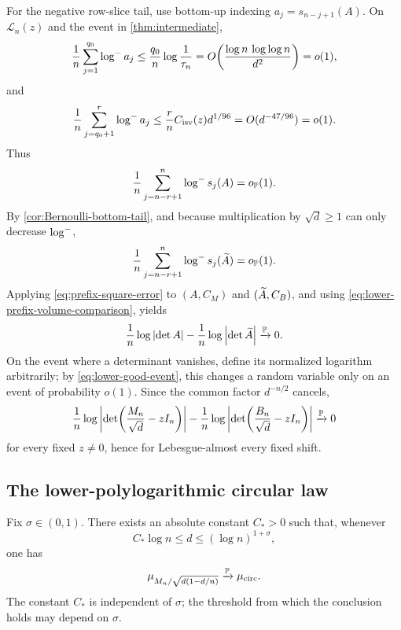 For the negative row-slice tail, use bottom-up indexing
$a_j=s_{n-j+1}(A)$. On $\mathcal L_n(z)$ and the event in \cref{thm:intermediate},
\begin{equation}\label{eq:lower-bottom-q0}
  \frac1n\sum_{j=1}^{q_0}\log^{-} a_j
  \le\frac{q_0}{n}\log\frac1{\tau_n}
  =O\!\left(\frac{\log n\,\log\log n}{d^2}\right)=o(1),
\end{equation}
and
\begin{equation}\label{eq:lower-bottom-intermediate}
  \frac1n\sum_{j=q_0+1}^{r}\log^{-} a_j
  \le\frac rn C_{\mathrm{isv}}(z)d^{1/96}
  =O(d^{-47/96})=o(1).
\end{equation}
Thus
\begin{equation}\label{eq:lower-row-bottom-tail}
  \frac1n\sum_{j=n-r+1}^n\log^{-} s_j(A)=o_{\mathbb P}(1).
\end{equation}
By \cref{cor:Bernoulli-bottom-tail}, and because multiplication by $\sqrt d\ge1$ can only decrease $\log^{-}$,
\begin{equation}\label{eq:lower-Bernoulli-bottom-tail}
  \frac1n\sum_{j=n-r+1}^n\log^{-} s_j(\widetilde A)=o_{\mathbb P}(1).
\end{equation}
Applying \eqref{eq:prefix-square-error} to $(A,C_M)$ and $(\widetilde A,C_B)$, and using \eqref{eq:lower-prefix-volume-comparison}, yields
\begin{equation}\label{eq:lower-unnormalized-det-comparison}
  \frac1n\log\left|\det A\right|
  -\frac1n\log\left|\det\widetilde A\right|
  \xrightarrow{\mathbb P}0.
\end{equation}
On the event where a determinant vanishes, define its normalized logarithm arbitrarily; by \eqref{eq:lower-good-event}, this changes a random variable only on an event of probability $o(1)$. Since the common factor $d^{-n/2}$ cancels,
\begin{equation}\label{eq:lower-normalized-det-comparison}
  \frac1n\log\left|\det\!\left(\frac{M_n}{\sqrt d}-zI_n\right)\right|
  -\frac1n\log\left|\det\!\left(\frac{B_n}{\sqrt d}-zI_n\right)\right|
  \xrightarrow{\mathbb P}0
\end{equation}
for every fixed $z\ne0$, hence for Lebesgue-almost every fixed shift.

\subsection{The lower-polylogarithmic circular law}

\begin{theorem}\label{thm:lower-band-circular}
Fix $\sigma\in(0,1)$. There exists an absolute constant $C_*>0$ such that, whenever
\[
  C_*\log n\le d\le(\log n)^{1+\sigma},
\]
one has
\[
  \mu_{M_n/\sqrt{d(1-d/n)}}\xrightarrow{\mathbb P}\mu_{\mathrm{circ}}.
\]
The constant $C_*$ is independent of $\sigma$; the threshold from which the conclusion holds may depend on $\sigma$.
\end{theorem}

